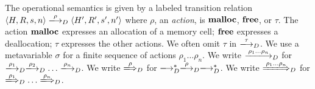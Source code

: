 The operational semantics is given by a labeled transition relation
\(\langle H, R, s, n \rangle \xlongrightarrow{\rho}_D \langle H', R',
s', n' \rangle\) where \(\rho\), an \emph{action}, is \(\mathbf{malloc}\),
\(\mathbf{free}\), or \(\tau\).  The action \(\mathbf{malloc}\) expresses an
allocation of a memory cell; \(\mathbf{free}\) expresses a deallocation;
\(\tau\) expresses the other actions.  We often omit \(\tau\) in
\(\xlongrightarrow{\tau}_D\).  We use a metavariable \(\sigma\) for a
finite sequence of actions \(\rho_1\dots\rho_n\).  We write
\(\xlongrightarrow{\rho_1\dots\rho_n}_D\) for
\(\xlongrightarrow{\rho_1}_D\xlongrightarrow{\rho_2}_D\dots\xlongrightarrow{\rho_n}_D\).
We write \(\xLongrightarrow{\rho}_D\) for
\(\xlongrightarrow{}_D^*\xlongrightarrow{\rho}_D\xlongrightarrow{}_D^*\).
We write \(\xLongrightarrow{\rho_1\dots\rho_n}_D\) for
\(\xLongrightarrow{\rho_1}_D\dots\xLongrightarrow{\rho_n}_D\).



